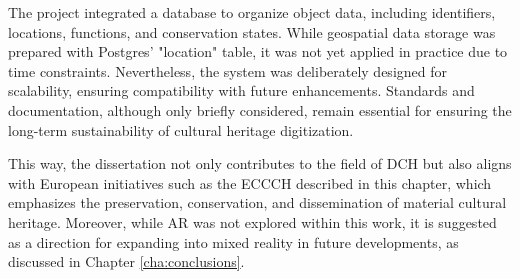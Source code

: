 The project integrated a database to organize object data, including identifiers, locations, functions, and conservation states. While geospatial data storage was prepared with Postgres' "location" table, it was not yet applied in practice due to time constraints. Nevertheless, the system was deliberately designed for scalability, ensuring compatibility with future enhancements. Standards and documentation, although only briefly considered, remain essential for ensuring the long-term sustainability of cultural heritage digitization.

This way, the dissertation not only contributes to the field of \gls{DCH} but also aligns with European initiatives such as the \gls{ECCCH} described in this chapter, which emphasizes the preservation, conservation, and dissemination of material cultural heritage. 
Moreover, while \gls{AR} was not explored within this work, it is suggested as a direction for expanding into mixed reality in future developments, as discussed in Chapter \ref{cha:conclusions}.


